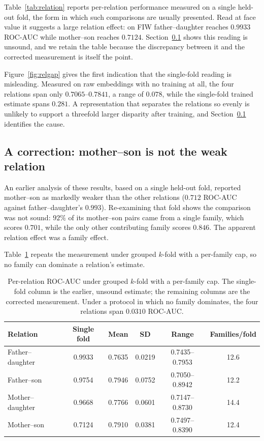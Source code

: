 \documentclass[preprint,12pt]{elsarticle}
\begin{document}
Table~\ref{tab:relation} reports per-relation performance measured on a single
held-out fold, the form in which such comparisons are usually presented. Read
at face value it suggests a large relation effect: on FIW father--daughter
reaches $0.9933$ ROC-AUC while mother--son reaches $0.7124$.
Section~\ref{sec:mscorrection} shows this reading is unsound, and we retain the
table because the discrepancy between it and the corrected measurement is
itself the point.

Figure~\ref{fig:relgap} gives the first indication that the single-fold
reading is misleading. Measured on raw embeddings with no training at all, the
four relations span only $0.7065$--$0.7841$, a range of $0.078$, while the
single-fold trained estimate spans $0.281$. A representation that separates the
relations so evenly is unlikely to support a threefold larger disparity after
training, and Section~\ref{sec:mscorrection} identifies the cause.

\subsection{A correction: mother--son is not the weak relation}
\label{sec:mscorrection}

An earlier analysis of these results, based on a single held-out fold,
reported mother--son as markedly weaker than the other relations
($0.712$ ROC-AUC against father--daughter's $0.993$). Re-examining that fold
shows the comparison was not sound: $92\%$ of its mother--son pairs came from a
single family, which scores $0.701$, while the only other contributing family
scores $0.846$. The apparent relation effect was a family effect.

Table~\ref{tab:relation_kfold} repeats the measurement under grouped $k$-fold
with a per-family cap, so no family can dominate a relation's estimate.

\begin{table}[t]
\centering
\caption{Per-relation ROC-AUC under grouped $k$-fold with a per-family cap.
The single-fold column is the earlier, unsound estimate; the remaining columns
are the corrected measurement. Under a protocol in which no family dominates,
the four relations span $0.0310$ ROC-AUC.}
\label{tab:relation_kfold}
\small
\begin{tabular}{lccccc}
\toprule
Relation & Single fold & Mean & SD & Range & Families/fold \\
\midrule
Father--daughter & 0.9933 & 0.7635 & 0.0219 & 0.7435--0.7953 & 12.6 \\
Father--son & 0.9754 & 0.7946 & 0.0752 & 0.7050--0.8942 & 12.2 \\
Mother--daughter & 0.9668 & 0.7766 & 0.0601 & 0.7147--0.8730 & 14.4 \\
Mother--son & 0.7124 & 0.7910 & 0.0381 & 0.7497--0.8390 & 12.4 \\
\bottomrule
\end{tabular}
\end{table}
\end{document}
